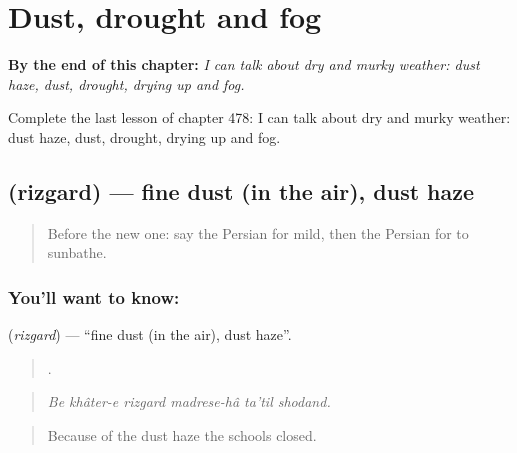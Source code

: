 
\chapter{Dust, drought and fog}
\label{ch:fa-dust-drought-and-fog}

\begin{chapteropening}
\textbf{By the end of this chapter:} \emph{I can talk about dry and murky weather: dust haze, dust, drought, drying up and fog.}

Complete the last lesson of chapter 478: I can talk about dry and murky weather: dust haze, dust, drought, drying up and fog.
\end{chapteropening}

\section[\texorpdfstring{\fa{ریزگرد} (rizgard)}{ریزگرد (rizgard)}]{ (rizgard) — fine dust (in the air), dust haze}

\label{lesson:FA-C478-rizgard}



\begin{quote}
Before the new one: say the Persian for mild, then the Persian for to sunbathe.
\end{quote}

\subsection*{You'll want to know: }
\textbf{} (\emph{rizgard}) — \textquotedblleft{}fine dust (in the air), dust haze\textquotedblright{}.

\begin{quote}
      .
\end{quote}

\begin{quote}
\emph{Be khâter-e rizgard madrese-hâ ta'til shodand.}
\end{quote}

\begin{quote}
Because of the dust haze the schools closed.
\end{quote}

